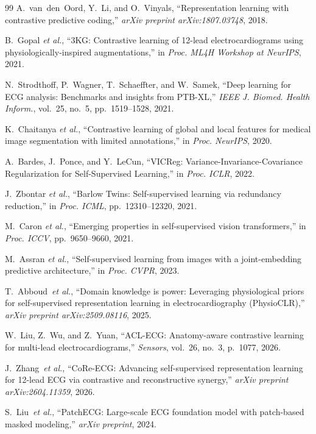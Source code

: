 \documentclass[journal,10pt]{IEEEtran}
\newcommand{\etal}{\textit{et al.}}
\begin{document}
\begin{thebibliography}{99}
A.~van~den~Oord, Y.~Li, and O.~Vinyals, ``Representation learning with contrastive predictive coding,'' \textit{arXiv preprint arXiv:1807.03748}, 2018.

B.~Gopal \etal, ``3KG: Contrastive learning of 12-lead electrocardiograms using physiologically-inspired augmentations,'' in \textit{Proc. ML4H Workshop at NeurIPS}, 2021.




N.~Strodthoff, P.~Wagner, T.~Schaeffter, and W.~Samek, ``Deep learning for ECG analysis: Benchmarks and insights from PTB-XL,'' \textit{IEEE J. Biomed. Health Inform.}, vol.~25, no.~5, pp.~1519--1528, 2021.

K.~Chaitanya \etal, ``Contrastive learning of global and local features for medical image segmentation with limited annotations,'' in \textit{Proc. NeurIPS}, 2020.

A.~Bardes, J.~Ponce, and Y.~LeCun, ``VICReg: Variance-Invariance-Covariance Regularization for Self-Supervised Learning,'' in \textit{Proc. ICLR}, 2022.

J.~Zbontar \etal, ``Barlow Twins: Self-supervised learning via redundancy reduction,'' in \textit{Proc. ICML}, pp.~12310--12320, 2021.

M.~Caron \etal, ``Emerging properties in self-supervised vision transformers,'' in \textit{Proc. ICCV}, pp.~9650--9660, 2021.

M.~Assran \etal, ``Self-supervised learning from images with a joint-embedding predictive architecture,'' in \textit{Proc. CVPR}, 2023.

T.~Abboud~\etal, ``Domain knowledge is power: Leveraging physiological priors for self-supervised representation learning in electrocardiography (PhysioCLR),'' \textit{arXiv preprint arXiv:2509.08116}, 2025.

W.~Liu, Z.~Wu, and Z.~Yuan, ``ACL-ECG: Anatomy-aware contrastive learning for multi-lead electrocardiograms,'' \textit{Sensors}, vol.~26, no.~3, p.~1077, 2026.

J.~Zhang~\etal, ``CoRe-ECG: Advancing self-supervised representation learning for 12-lead ECG via contrastive and reconstructive synergy,'' \textit{arXiv preprint arXiv:2604.11359}, 2026.

S.~Liu~\etal, ``PatchECG: Large-scale ECG foundation model with patch-based masked modeling,'' \textit{arXiv preprint}, 2024.


\end{thebibliography}
\end{document}
